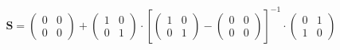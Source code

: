 \[ \mathbf{S} = \left(\begin{array}{cc} 0 & 0 \\ 0 & 0
\end{array}\right) + \left(\begin{array}{cc} 1 & 0 \\ 0 & 1
\end{array}\right) \cdot \left[ \left(\begin{array}{cc} 1 & 0 \\ 0 & 1
\end{array}\right) - \left(\begin{array}{cc} 0 & 0 \\ 0 & 0
\end{array}\right) \right]^{-1} \cdot\left(\begin{array}{cc} 0 & 1 \\
1 & 0 \end{array}\right) \]
